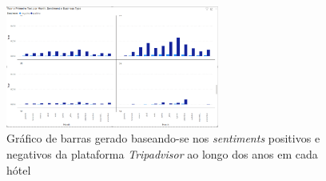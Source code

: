\begin{figure}[!htb]
\centering
\includegraphics[width=7cm]{figuras/Pos&NegSentimentsPerMonth&BusinessType/2.PNG}
\caption{Gráfico de barras gerado baseando-se nos \textit{sentiments} positivos e negativos da plataforma \textit{Tripadvisor} ao longo dos anos em cada hótel}
\label{fig:exemplofig}
\end{figure}


